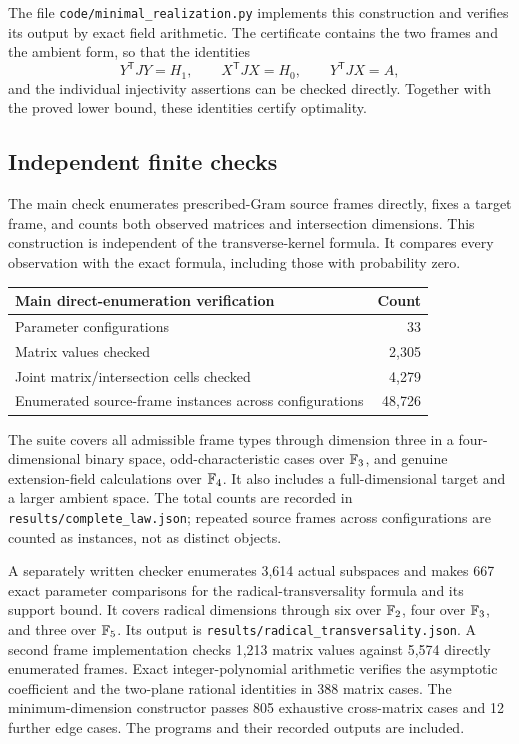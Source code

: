 The file \texttt{code/minimal\_realization.py} implements this construction and verifies its output by exact field arithmetic. The certificate contains the two frames and the ambient form, so that the identities
\[
 Y^{\mathsf T}JY=H_1,\qquad X^{\mathsf T}JX=H_0,
 \qquad Y^{\mathsf T}JX=A,
\]
and the individual injectivity assertions can be checked directly. Together with the proved lower bound, these identities certify optimality.

\subsection{Independent finite checks}

The main check enumerates prescribed-Gram source frames directly, fixes a target frame, and counts both observed matrices and intersection dimensions. This construction is independent of the transverse-kernel formula. It compares every observation with the exact formula, including those with probability zero.

\begin{center}
\begin{tabular}{@{}lr@{}}
\toprule
Main direct-enumeration verification & Count\\
\midrule
Parameter configurations & 33\\
Matrix values checked & 2,305\\
Joint matrix/intersection cells checked & 4,279\\
Enumerated source-frame instances across configurations & 48,726\\
\bottomrule
\end{tabular}
\end{center}

The suite covers all admissible frame types through dimension three in a four-dimensional binary space, odd-characteristic cases over $\mathbb F_3$, and genuine extension-field calculations over $\mathbb F_4$. It also includes a full-dimensional target and a larger ambient space. The total counts are recorded in \texttt{results/complete\_law.json}; repeated source frames across configurations are counted as instances, not as distinct objects.

A separately written checker enumerates 3,614 actual subspaces and makes 667 exact parameter comparisons for the radical-transversality formula and its support bound. It covers radical dimensions through six over $\mathbb F_2$, four over $\mathbb F_3$, and three over $\mathbb F_5$. Its output is \texttt{results/radical\_transversality.json}. A second frame implementation checks 1,213 matrix values against 5,574 directly enumerated frames. Exact integer-polynomial arithmetic verifies the asymptotic coefficient and the two-plane rational identities in 388 matrix cases. The minimum-dimension constructor passes 805 exhaustive cross-matrix cases and 12 further edge cases. The programs and their recorded outputs are included.

